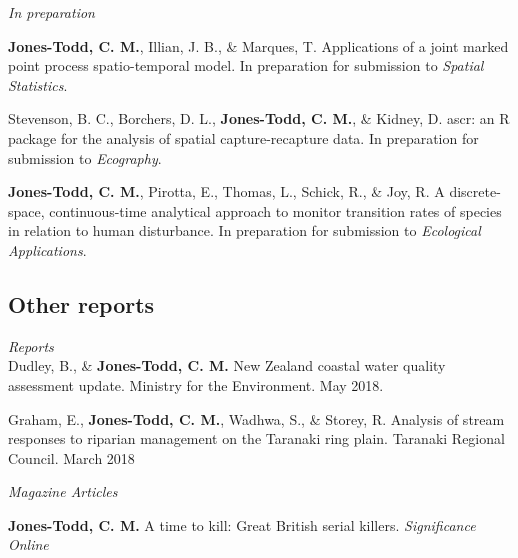 \documentclass[10pt,a4paper]{moderncv}
\begin{document}
\textit{\small{In preparation}}\\

\vspace{-3pt}

\textbf{Jones-Todd, C. M.}, Illian, J. B., \& Marques, T. Applications of a joint marked point process spatio-temporal model. In preparation for submission to \textit{Spatial Statistics}.\\
\vspace{5pt}

\vspace{-3pt}
Stevenson, B. C., Borchers, D. L., \textbf{Jones-Todd, C. M.}, \& Kidney, D. ascr: an R package for the analysis of spatial capture-recapture data. In preparation for submission to \textit{Ecography}.\\
\vspace{5pt}

\vspace{-3pt}

\textbf{Jones-Todd, C. M.}, Pirotta, E., Thomas, L., Schick, R., \& Joy, R.  A discrete-space, continuous-time analytical approach to monitor transition rates of species in relation to human disturbance.  In preparation for submission to \textit{Ecological Applications}.\\

\subsection{Other reports}

\vspace{5pt}

\textit{\small{Reports}}\\

Dudley, B., \& \textbf{Jones-Todd, C. M.} New Zealand coastal water quality assessment update. Ministry for the Environment. May 2018.

\vspace{5pt}

Graham, E., \textbf{Jones-Todd, C. M.}, Wadhwa, S., \& Storey, R. Analysis of stream responses to riparian management on the Taranaki ring plain. Taranaki Regional Council. March 2018\\
\newpage

\textit{\small{Magazine Articles}}\\

\vspace{-3pt}

\textbf{Jones-Todd, C. M.} A time to kill: Great British serial killers. \textit{Significance Online}
\end{document}
